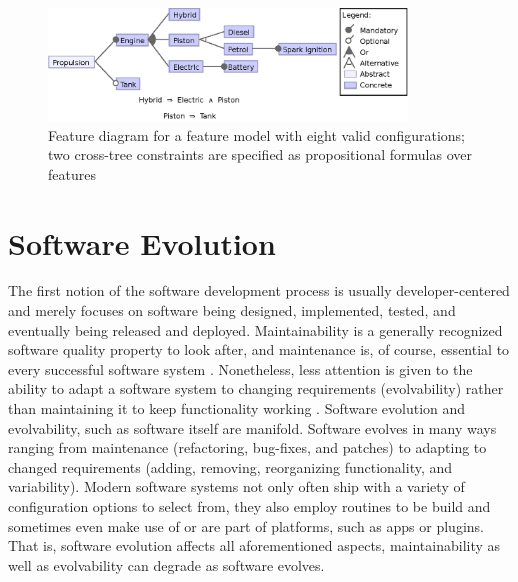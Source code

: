 \begin{figure}[htbp]
  \centering
  
  	\includegraphics[width=0.85\textwidth]{images/introduction_fm.eps}
  \caption{Feature diagram for a feature model with eight valid configurations;
  two cross-tree constraints are specified as propositional formulas over
  features}
  \label{fig:introduction_fm}
\end{figure}

\section{Software Evolution} \label{sec:evolving_solftware}
The first notion of the software development process is usually
developer-centered and merely focuses on software being designed, implemented,
tested, and eventually being released and deployed.
Maintainability is a generally recognized software quality
property to look after, and maintenance is, of course, essential to every
successful software system \citep{liggesmeyer_software-qualitat:_2009}.
Nonetheless, less attention is given to the ability to adapt a software system to changing requirements (evolvability) rather than maintaining it to keep functionality
working \citep{parnas_software_1994}. Software evolution and evolvability, such
as software itself are manifold. Software evolves in many ways ranging from
maintenance (refactoring, bug-fixes, and patches) to adapting to changed
requirements (adding, removing, reorganizing functionality, and variability).
Modern software systems not only often ship with a variety of configuration
options to select from, they also employ routines to be build and sometimes even
make use of or are part of platforms, such as apps or plugins. That is,
software evolution affects all aforementioned aspects, maintainability as
well as evolvability can degrade as software evolves.

